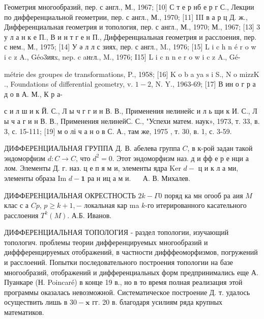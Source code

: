 \documentclass[10pt]{article}
\begin{document}
Геометрия многообразий, пер. с англ., М., 1967; [10] С т е р нб е р г С., Лекции по дифференциальной геометрии, пер. с англ., М., 1970; [11] III в а р ц Д. ж., Дифференциальная геометрия и топология, пер. с англ., М., 1970; М., 1967; [13] 3 у л а н к е П., В и н т г е н П., Дифференциальная геометрия и расслоения, пер. с нем., М., 1975; [14] У ә л л с зиях, пер. с англ., M., 1976; [15] L i c h n é r o w i c z A., Géo3ияx, nep. c aнrл., M., 1976; I15] L i c n n e r o w i c z A., Gé-

métrie des groupes de transformations, P., 1958; [16] K o b a ya $\mathrm{s}$ i S., $\mathrm{N}$ o $\mathrm{m} \mathrm{i} \mathrm{z} \mathrm{z} \mathrm{K}$., Foundations of differential geometry, v. $1-2$, N. Y., 1963-69; [17] В ин о г р а д о в А. М., К р а-

с и л ш и к Й. С., Л ы ч г г и н В. В., Применения нелинейс и л ь щи к И. С., Л ы ч а г и н В. В., Применения нелинейС. С., "Успехи матем. наук», 1973, т. 33, в. 3, с. 15-111; [19] м о лі ч а н о в С. А., там же, 1975 , т. 30, в. 1, с. 3-59.



ДИФФЕРЕНЦИАЛЬНАЯ ГРУППА Д. В. абелева группа $C$, в к-рой задан такой эндоморфизм $d: C \rightarrow C$, что $d^{2}=0$. Этот эндоморфизм наз. д и фф е р е нци а лом. Элементы Д. г. наз. ц е п я м и, элементы ядра Ker $d-$ ц и к л а ми, элементы образа Im $d-\boldsymbol{1}$ ра н иц а м и. $\quad$ А. В. Михалев.



ДИФФЕРЕНЦИАЛЬНАЯ ОКРЕСТНОСТЬ $2 k-\Gamma 0$ поряд ка мн огооб ра аия $M$ клас с а $C p$, $p \geqslant k+1,-$ локальная кар ma $k$-го итерированного касательного расслоения $T^{k}(M)$. А.Б. Иванов.



ДИФФЕРЕНЦИАЛЬНАЯ ТОПОЛОГИЯ - раздел топологии, изучающий топологич. проблемы теории дифференцируемых многообразий и диффференцируемых отображений, в частности дифффеоморфизмов, погружений и расслоений. Попытки последовательного построения топологии на базе многообразий, отображений и дифференциальных форм предпринимались еще А. Пуанкаре (Н. Poincaré) в конце 19 в., но в то время полная реализация этой программы оказалась невозможной. Систематическое построение Д. т. удалось осуществить лишь в $30-\mathbf{x}$ гг. 20 в. благодаря усилиям ряда крупных математиков.
\end{document}

